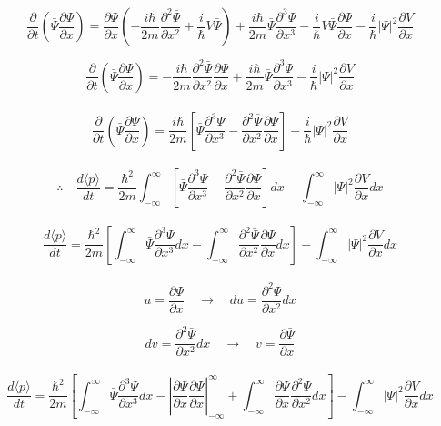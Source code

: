 \documentclass[10pt,a4papper]{article}
\begin{document}
\[\frac{\partial}{\partial t}\left(\bar\Psi\frac{\partial\Psi}{\partial x}\right)=
\frac{\partial\Psi}{\partial x}\left(-\frac{i\hbar}{2m}\frac{\partial^2\bar\Psi}{\partial x^2}+\frac{i}{\hbar}V\bar\Psi\right)
+\frac{i\hbar}{2m}\bar\Psi\frac{\partial^3\Psi}{\partial x^3}
-\frac{i}{\hbar}V\bar\Psi\frac{\partial\Psi}{\partial x}
-\frac{i}{\hbar}|\Psi|^2\frac{\partial V}{\partial x}\]

\newpage
\[\frac{\partial}{\partial t}\left(\bar\Psi\frac{\partial\Psi}{\partial x}\right)=
-\frac{i\hbar}{2m}\frac{\partial^2\bar\Psi}{\partial x^2}\frac{\partial\Psi}{\partial x}
+\frac{i\hbar}{2m}\bar\Psi\frac{\partial^3\Psi}{\partial x^3}
-\frac{i}{\hbar}|\Psi|^2\frac{\partial V}{\partial x}\]\\

\[\frac{\partial}{\partial t}\left(\bar\Psi\frac{\partial\Psi}{\partial x}\right)=
\frac{i\hbar}{2m}\left[
  \bar\Psi\frac{\partial^3\Psi}{\partial x^3}
  -\frac{\partial^2\bar\Psi}{\partial x^2}\frac{\partial\Psi}{\partial x}\right]
-\frac{i}{\hbar}|\Psi|^2\frac{\partial V}{\partial x}\]\\

\[\therefore\quad\frac{d\langle p\rangle}{dt}=
\frac{\hbar^2}{2m}\int_{-\infty}^\infty\left[
  \bar\Psi\frac{\partial^3\Psi}{\partial x^3}
  -\frac{\partial^2\bar\Psi}{\partial x^2}\frac{\partial\Psi}{\partial x}\right]dx
-\int_{-\infty}^\infty|\Psi|^2\frac{\partial V}{\partial x}dx\]\\

\[\frac{d\langle p\rangle}{dt}=
\frac{\hbar^2}{2m}\left[
  \int_{-\infty}^\infty\bar\Psi\frac{\partial^3\Psi}{\partial x^3}dx
  -\int_{-\infty}^\infty\frac{\partial^2\bar\Psi}{\partial x^2}\frac{\partial\Psi}{\partial x}dx\right]
-\int_{-\infty}^\infty|\Psi|^2\frac{\partial V}{\partial x}dx\]\\

\[u=\frac{\partial\Psi}{\partial x}\quad\to\quad du=\frac{\partial^2\Psi}{\partial x^2}dx\]

\[dv=\frac{\partial^2\bar\Psi}{\partial x^2}dx\quad\to\quad v=\frac{\partial\bar\Psi}{\partial x}\]\\

\[\frac{d\langle p\rangle}{dt}=
\frac{\hbar^2}{2m}\left[
  \int_{-\infty}^\infty\bar\Psi\frac{\partial^3\Psi}{\partial x^3}dx
  -\left|\frac{\partial\bar\Psi}{\partial x}\frac{\partial\Psi}{\partial x}\right|_{-\infty}^\infty
  +\int_{-\infty}^\infty\frac{\partial\bar\Psi}{\partial x}\frac{\partial^2\Psi}{\partial x^2}dx\right]
-\int_{-\infty}^\infty|\Psi|^2\frac{\partial V}{\partial x}dx\]\\
\end{document}
